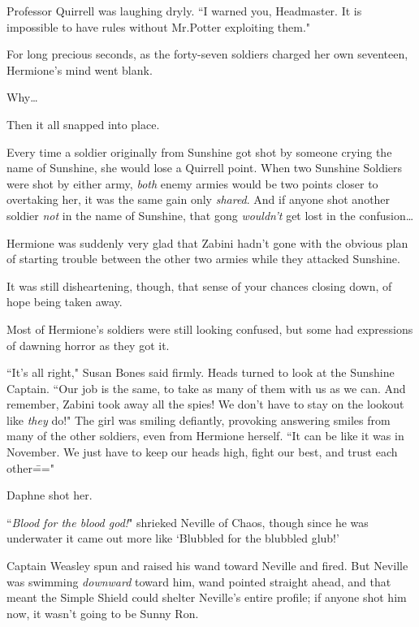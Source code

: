 Professor Quirrell was laughing dryly. ``I warned you, Headmaster. It is impossible to have rules without Mr.\?Potter exploiting them."

\later

For long precious seconds, as the forty-seven soldiers charged her own seventeen, Hermione's mind went blank.

Why{\ldots}

Then it all snapped into place.

Every time a soldier originally from Sunshine got shot by someone crying the name of Sunshine, she would lose a Quirrell point. When two Sunshine Soldiers were shot by either army, \emph{both} enemy armies would be two points closer to overtaking her, it was the same gain only \emph{shared}. And if anyone shot another soldier \emph{not} in the name of Sunshine, that gong \emph{wouldn't} get lost in the confusion{\ldots}

Hermione was suddenly very glad that Zabini hadn't gone with the obvious plan of starting trouble between the other two armies while they attacked Sunshine.

It was still disheartening, though, that sense of your chances closing down, of hope being taken away.

Most of Hermione's soldiers were still looking confused, but some had expressions of dawning horror as they got it.

``It's all right," Susan Bones said firmly. Heads turned to look at the Sunshine Captain. ``Our job is the same, to take as many of them with us as we can. And remember, Zabini took away all the spies! We don't have to stay on the lookout like \emph{they} do!" The girl was smiling defiantly, provoking answering smiles from many of the other soldiers, even from Hermione herself. ``It can be like it was in November. We just have to keep our heads high, fight our best, and trust each other\==="

Daphne shot her.

\later

``\emph{Blood for the blood god!}" shrieked Neville of Chaos, though since he was underwater it came out more like `Blubbled for the blubbled glub!'

Captain Weasley spun and raised his wand toward Neville and fired. But Neville was swimming \emph{downward} toward him, wand pointed straight ahead, and that meant the Simple Shield could shelter Neville's entire profile; if anyone shot him now, it wasn't going to be Sunny Ron.

